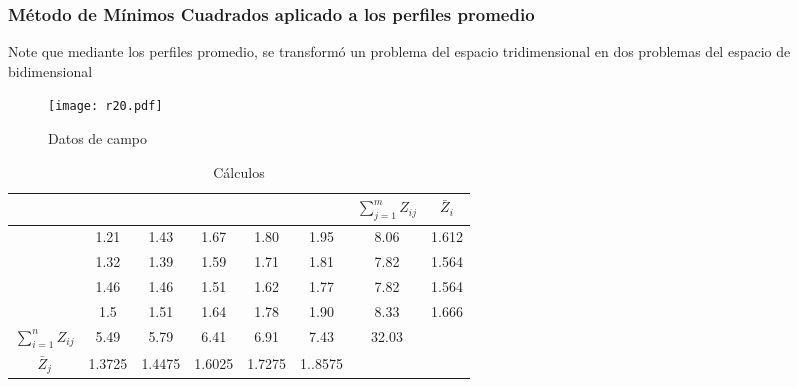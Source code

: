 \subsubsection{Método de Mínimos Cuadrados aplicado a los perfiles promedio}
Note que mediante los perfiles promedio, se transformó un problema del espacio tridimensional en dos problemas del espacio de bidimensional
\begin{figure}[h!]
\centering
  \texttt{[image: r20.pdf]}
  \caption{Datos de campo}
  \label{r20}
\end{figure}
\begin{table}[h!]
    \centering
    \begin{tabular}{@{}cccccccc@{}}
    \toprule
                            &        &        &        &        &                           & $\sum_{j=1}^{m} Z_{ij}$ & $\bar{Z}_i$ \\ \midrule
                            & 1.21   & 1.43   & 1.67   & 1.80   & \multicolumn{1}{c|}{1.95} & 8.06                    & 1.612       \\
                            & 1.32   & 1.39   & 1.59   & 1.71   & \multicolumn{1}{c|}{1.81} & 7.82                    & 1.564       \\
                            & 1.46   & 1.46   & 1.51   & 1.62   & \multicolumn{1}{c|}{1.77} & 7.82                    & 1.564       \\
                            & 1.5    & 1.51   & 1.64   & 1.78   & \multicolumn{1}{c|}{1.90} & 8.33                    & 1.666       \\
    $\sum_{i=1}^{n} Z_{ij}$ & 5.49   & 5.79   & 6.41   & 6.91   & \multicolumn{1}{c|}{7.43} & 32.03                   &             \\ \midrule
    $\bar{Z}_j$             & 1.3725 & 1.4475 & 1.6025 & 1.7275 & 1..8575                   &                         &             \\ \bottomrule
    \end{tabular}
    \caption{Cálculos}
    \label{tabr4}
\end{table}
